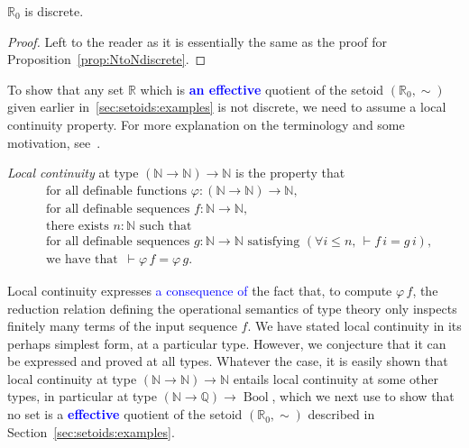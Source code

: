 \documentclass[envcountsame]{llncs}
\newcommand{\amend}[2][]{\textcolor{blue}{#2}}
\newcommand{\definable}{\amend[]{\textbf{effective }}}
\newcommand{\adefinable}{\amend[]{\textbf{an effective }}}
\newcommand{\N}{\mathbb{N}}
\newcommand{\Q}{\mathbb{Q}}
\newcommand{\R}{\mathbb{R}}
\DeclareMathOperator{\Bool}{Bool}
\newcommand{\fad}{\text{for all definable }}
\begin{document}
\begin{proposition}\label{prop:RZdiscrete}
 $\R_0$ is discrete.
\end{proposition}
\begin{proof}
Left to the reader as it is essentially the same as the proof for Proposition~\ref{prop:NtoNdiscrete}.
\end{proof}
To show that any set $\R$ which is \adefinable quotient of the setoid $(\R_0,\sim)$ given earlier in~\ref{sec:setoids:examples} is not discrete, we need to assume a local continuity property.
For more explanation on the terminology and some motivation, see~\cite[p.208]
{toelstra1988book}.
\begin{definition}\label{def:localcontinuity}
\emph{Local continuity} at type $(\N \to \N) \to \N$ is the property that
\begin{align*}
   &\fad\text{functions }\varphi : (\N \to \N) \to \N,\\
   &\fad\text{sequences }f : \N \to \N,\\
   &\text{there exists }  n:\N\text{ such that }\\
   &\fad\text{sequences } g : \N \to \N \text{ satisfying } (\forall i\leq n,\, \vdash f\,i = g\,i),\\
   &\text{we have that }{\,\vdash \varphi\, f} = \varphi\, g.
\end{align*}
\end{definition}
Local continuity expresses \amend{a consequence of} the fact that, to compute $\varphi\,f$, the reduction relation defining the operational semantics of type theory only inspects finitely many terms of the input sequence $f$. We have stated local continuity in its perhaps simplest form, at a particular type. However, we conjecture that it can be expressed and proved at all types. Whatever the case, it is easily shown that local continuity at type $(\N\to\N)\to\N$  entails local continuity at some other types, in particular at type $(\N\to\Q)\to\Bool$, which we next use to show that no set is a \definable quotient of the setoid $(\R_0,\sim)$ described in Section~\ref{sec:setoids:examples}.
\end{document}
